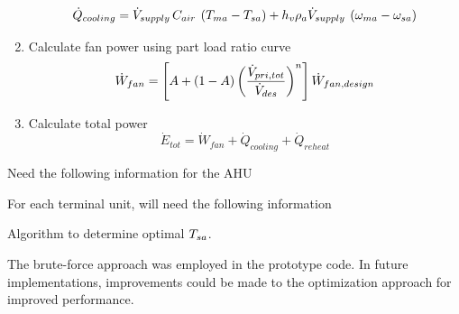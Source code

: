 \begin{enumerate}
\begin{equation}
            {\dot Q_{cooling}} = {\dot{V}_{supply}}\,C_{air}\:\left(
            {{T_{ma}{}} - {T_{sa}}} \right) + h_v\rho_a{\dot{V}_{supply}}\:\left( {{\omega _{ma}} - {\omega _{sa}}} \right)
        \end{equation}
    \item Calculate fan power using part load ratio curve
        \begin{equation}\label{eq:TotalFanPower}
            \dot{W}_{fan} = \left[A + \left(1-A\right)\left(\frac{\dot{V}_{pri,tot}}{\dot{V}_{des}}\right)^{n}\right] \dot{W}_{fan,design} 
        \end{equation}
    \item Calculate total power 
        \begin{equation}\label{eq:TotalPowerSystem}
            \dot{E}_{tot} = \dot{W}_{fan} + \dot{Q}_{cooling} + \dot{Q}_{reheat}
        \end{equation}
\end{enumerate}

\begin{algorithm}
\SetAlgoLined
Need the following information for the AHU\par
{}
For each terminal unit, will need the following information \par
{}



\caption{Algorithm to determine optimal \(T_{sa}{}\).}
\end{algorithm}


The brute-force approach was employed in the prototype code. In future
implementations, improvements could be made to the optimization approach
for improved performance.

